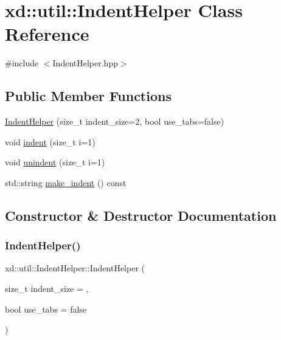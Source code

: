 \hypertarget{classxd_1_1util_1_1_indent_helper}{}\section{xd\+:\+:util\+:\+:Indent\+Helper Class Reference}
\label{classxd_1_1util_1_1_indent_helper}


{\ttfamily \#include $<$Indent\+Helper.\+hpp$>$}

\subsection*{Public Member Functions}
\begin{DoxyCompactItemize}
\item 
\mbox{\hyperlink{classxd_1_1util_1_1_indent_helper_af73cc9e2494d5b35467de7bef3855bce}{Indent\+Helper}} (size\+\_\+t indent\+\_\+size=2, bool use\+\_\+tabs=false)
\item 
void \mbox{\hyperlink{classxd_1_1util_1_1_indent_helper_a88bc31a52660ade954b728e981e2a03e}{indent}} (size\+\_\+t i=1)
\item 
void \mbox{\hyperlink{classxd_1_1util_1_1_indent_helper_a77dc7e1ba20b3145ed7bd7b73777741d}{unindent}} (size\+\_\+t i=1)
\item 
std\+::string \mbox{\hyperlink{classxd_1_1util_1_1_indent_helper_ad410eb0a0b1d6f18dbf38dc2dd33686f}{make\+\_\+indent}} () const
\end{DoxyCompactItemize}


\subsection{Constructor \& Destructor Documentation}
\mbox{\label{classxd_1_1util_1_1_indent_helper_af73cc9e2494d5b35467de7bef3855bce}} 
\subsubsection{\texorpdfstring{Indent\+Helper()}{IndentHelper()}}
{\footnotesize\ttfamily xd\+::util\+::\+Indent\+Helper\+::\+Indent\+Helper (\begin{DoxyParamCaption}\item[{size\+\_\+t}]{indent\+\_\+size = {},  }\item[{bool}]{use\+\_\+tabs = {\ttfamily false} }\end{DoxyParamCaption})\hspace{0.3cm}{\ttfamily [inline]}}



